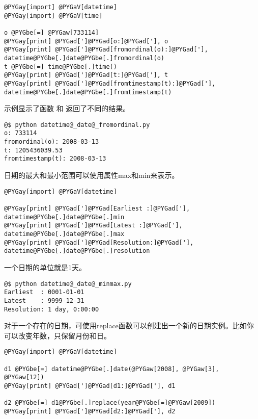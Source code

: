 \documentclass[a4paper,10pt,english]{manual}
\begin{document}
\begin{Verbatim}[commandchars=@\[\]]
@PYGay[import] @PYGaV[datetime]
@PYGay[import] @PYGaV[time]

o @PYGbe[=] @PYGaw[733114]
@PYGay[print] @PYGad[']@PYGad[o:]@PYGad['], o
@PYGay[print] @PYGad[']@PYGad[fromordinal(o):]@PYGad['], datetime@PYGbe[.]date@PYGbe[.]fromordinal(o)
t @PYGbe[=] time@PYGbe[.]time()
@PYGay[print] @PYGad[']@PYGad[t:]@PYGad['], t
@PYGay[print] @PYGad[']@PYGad[fromtimestamp(t):]@PYGad['], datetime@PYGbe[.]date@PYGbe[.]fromtimestamp(t)
\end{Verbatim}

示例显示了函数  和  返回了不同的结果。

\begin{Verbatim}[commandchars=@\[\]]
@$ python datetime@_date@_fromordinal.py
o: 733114
fromordinal(o): 2008-03-13
t: 1205436039.53
fromtimestamp(t): 2008-03-13
\end{Verbatim}

日期的最大和最小范围可以使用属性max和min来表示。

\begin{Verbatim}[commandchars=@\[\]]
@PYGay[import] @PYGaV[datetime]

@PYGay[print] @PYGad[']@PYGad[Earliest :]@PYGad['], datetime@PYGbe[.]date@PYGbe[.]min
@PYGay[print] @PYGad[']@PYGad[Latest :]@PYGad['], datetime@PYGbe[.]date@PYGbe[.]max
@PYGay[print] @PYGad[']@PYGad[Resolution:]@PYGad['], datetime@PYGbe[.]date@PYGbe[.]resolution
\end{Verbatim}

一个日期的单位就是1天。

\begin{Verbatim}[commandchars=@\[\]]
@$ python datetime@_date@_minmax.py
Earliest  : 0001-01-01
Latest    : 9999-12-31
Resolution: 1 day, 0:00:00
\end{Verbatim}

对于一个存在的日期，可使用replace函数可以创建出一个新的日期实例。比如你可以改变年数，只保留月份和日。

\begin{Verbatim}[commandchars=@\[\]]
@PYGay[import] @PYGaV[datetime]

d1 @PYGbe[=] datetime@PYGbe[.]date(@PYGaw[2008], @PYGaw[3], @PYGaw[12])
@PYGay[print] @PYGad[']@PYGad[d1:]@PYGad['], d1

d2 @PYGbe[=] d1@PYGbe[.]replace(year@PYGbe[=]@PYGaw[2009])
@PYGay[print] @PYGad[']@PYGad[d2:]@PYGad['], d2
\end{Verbatim}
\end{document}
